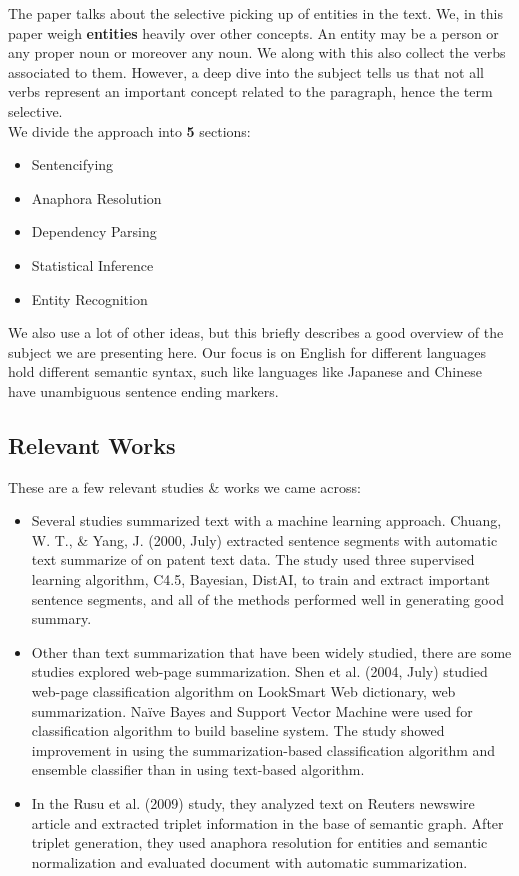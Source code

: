 \documentclass[conference]{IEEEtran}
\begin{document}
The paper talks about the selective picking up of entities in the text. We, in this paper weigh \textbf{entities} heavily over other concepts. An entity may be a person or any proper noun or moreover any noun. We along with this also collect the verbs associated to them. However, a deep dive into the subject tells us that not all verbs represent an important concept related to the paragraph, hence the term selective.\\
We divide the approach into \textbf{5} sections:
\begin{itemize}
\item Sentencifying
\item Anaphora Resolution
\item Dependency Parsing
\item Statistical Inference
\item Entity Recognition
\end{itemize}

We also use a lot of other ideas, but this briefly describes a good overview of the subject we are presenting here. Our focus is on English for different languages hold different semantic syntax, such like languages like Japanese and Chinese have unambiguous sentence ending markers.

\subsection{Relevant Works}
These are a few relevant studies \& works we came across:
\begin{itemize}
\item Several studies summarized text with a machine learning approach. Chuang, W. T., \& Yang, J. (2000, July) extracted sentence segments with automatic text summarize of on patent text data. The study used three supervised learning algorithm, C4.5, Bayesian, DistAI, to train and extract important sentence segments, and all of the methods performed well in generating good summary.

\item Other than text summarization that have been widely studied, there are some studies explored web-page summarization. Shen et al. (2004, July) studied web-page classification algorithm on LookSmart Web dictionary, web summarization. Naïve Bayes and Support Vector Machine were used for classification algorithm to build baseline system. The study showed improvement in using the summarization-based classification algorithm and ensemble classifier than in using text-based algorithm.

\item In the Rusu et al. (2009) study, they analyzed text on Reuters newswire article and extracted triplet information in the base of semantic graph. After triplet generation, they used anaphora resolution for entities and semantic normalization and evaluated document with automatic summarization.
\end{itemize}
\end{document}
